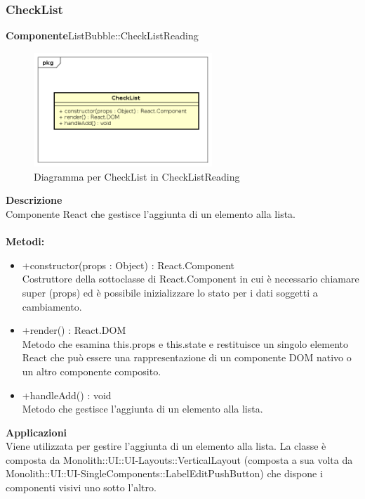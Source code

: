 \subsubsection{CheckList}
\textbf{Componente}ListBubble::CheckListReading\\
   \FloatBarrier
   \begin{figure}[ht]
   \centering
   \includegraphics[width=0.6\textwidth]{img/single-CheckList}
   \caption{{Diagramma per CheckList in CheckListReading}}
\end{figure}
\FloatBarrier
\textbf{Descrizione}\\
Componente React che gestisce l'aggiunta di un elemento alla lista.
\\
\\
\textbf{Metodi:} 
\begin{itemize}
\item +constructor(props : Object) : React.Component 
\\
Costruttore della sottoclasse di React.Component in cui è necessario chiamare super (props) ed è possibile inizializzare lo stato per i dati soggetti a cambiamento.

\item +render() : React.DOM 
\\
Metodo che esamina this.props e this.state e restituisce un singolo elemento React che può essere una rappresentazione di un componente DOM nativo o un altro componente composito.

\item +handleAdd() : void 
\\
Metodo che gestisce l'aggiunta di un elemento alla lista.
\end{itemize} 


\textbf{Applicazioni}\\
Viene utilizzata per gestire l'aggiunta di un elemento alla lista.
La classe è composta da Monolith::UI::UI-Layouts::VerticalLayout (composta a sua volta da Monolith::UI::UI-SingleComponents::LabelEditPushButton) che dispone i componenti visivi uno sotto l'altro. 


